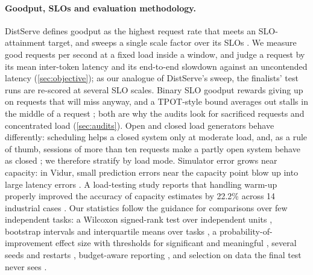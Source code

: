 \paragraph{Goodput, SLOs and evaluation methodology.}
DistServe defines goodput as the highest request rate that meets an SLO-attainment target, and
sweeps a single scale factor over its SLOs \citep{zhong2024distserve}. We measure good requests
per second at a fixed load inside a window, and judge a request by its mean inter-token latency
and its end-to-end slowdown against an uncontended latency (\cref{sec:objective}); as our
analogue of DistServe's sweep, the finalists' test runs are re-scored at several SLO scales.
Binary SLO goodput rewards giving up on requests that will miss anyway, and a TPOT-style bound
averages out stalls in the middle of a request \citep{wang2024slo}; both are why the audits look
for sacrificed requests and concentrated load (\cref{sec:audits}).
Open and closed load generators behave differently: scheduling helps a closed system only at
moderate load, and, as a rule of thumb, sessions of more than ten requests make a partly open
system behave as closed \citep{schroeder2006open}; we therefore stratify by load mode.
Simulator error grows near capacity: in Vidur, small prediction errors near the capacity point
blow up into large latency errors \citep{agrawal2024vidur}. A load-testing study reports that
handling warm-up properly improved the accuracy of capacity estimates by 22.2\% across 14
industrial cases \citep{abdelfattah2026loadtesting}.
Our statistics follow the guidance for comparisons over few independent tasks: a Wilcoxon
signed-rank test over independent units \citep{demsar2006}, bootstrap intervals and
interquartile means over tasks \citep{agarwal2021precipice}, a probability-of-improvement effect
size with thresholds for significant and meaningful \citep{bouthillier2021variance}, several
seeds and restarts \citep{henderson2018matters}, budget-aware reporting \citep{dodge2019show}, and
selection on data the final test never sees \citep{cawley2010overfitting}.

